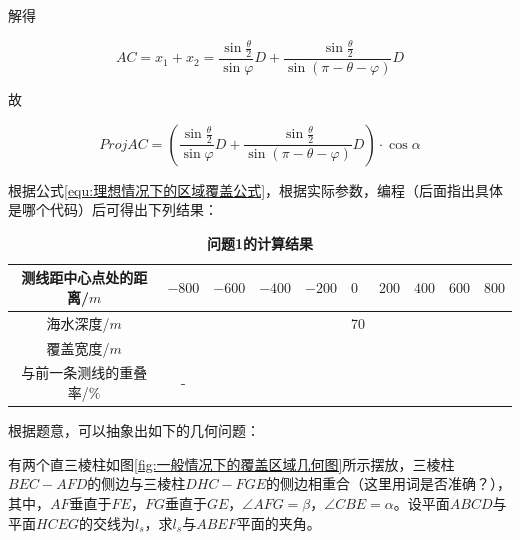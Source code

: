 解得

\begin{equation}
    AC = x_1 + x_2 
       = \frac{\sin\frac{\theta}{2}}{\sin\varphi}D + \frac{\sin\frac{\theta}{2}}{\sin(\pi - \theta - \varphi)}D
\end{equation}

故

\begin{equation}
    Proj AC = \left(\frac{\sin\frac{\theta}{2}}{\sin\varphi}D + \frac{\sin\frac{\theta}{2}}{\sin(\pi - \theta - \varphi)}D\right) \cdot \cos \alpha
    \label{equ:理想情况下的区域覆盖公式}
\end{equation}

根据公式\ref{equ:理想情况下的区域覆盖公式}，根据实际参数，编程（后面指出具体是哪个代码）后可得出下列结果：

\begin{table}[h]
    \centering
    \caption{\textbf{问题1的计算结果}}
    \begin{tabular}{@{}ccllllllll@{}}
    \toprule
    测线距中心点处的距离/$m$  & $-800$ & $-600$ & $-400$ & $-200$ & $0$ & $200$ & $400$ & $600$ & $800$ \\ \midrule
    海水深度/$m$        &      &      &      &      & 70  &     &     &     &     \\
    覆盖宽度/$m$        &      &      &      &      &   &     &     &     &     \\
    与前一条测线的重叠率/$\%$ &   -  &      &      &      &   &     &     &     &     \\ \bottomrule
    \end{tabular}
\end{table}



根据题意，可以抽象出如下的几何问题：

有两个直三棱柱如图\ref{fig:一般情况下的覆盖区域几何图}所示摆放，三棱柱$BEC-AFD$的侧边与三棱柱$DHC-FGE$的侧边相重合（这里用词是否准确？），其中，$AF$垂直于$FE$，$FG$垂直于$GE$，$\angle AFG=\beta$，$\angle CBE=\alpha$。设平面$ABCD$与平面$HCEG$的交线为$l_s$，求$l_s$与$ABEF$平面的夹角。

